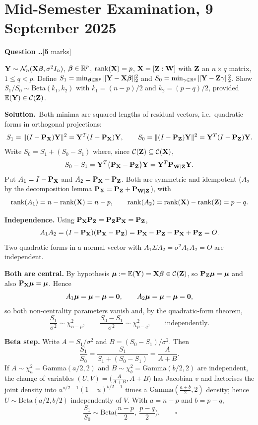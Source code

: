 \documentclass[11pt]{article}
\newcommand{\Pj}{\mathbf{P}}
\newcommand{\Bt}{\mathrm{Beta}}
\newcounter{qq}[section]
\newcommand{\qhead}[2]{\medskip\refstepcounter{qq}%
  \noindent\textbf{\color{Blue}Question \thesection.\theqq.}\hfill\textnormal{[\textbf{#1} marks]}%
  \ifx\relax#2\relax\else\par\smallskip\fi}
\newcommand{\sol}{\smallskip\noindent\textbf{\color{ForestGreen}Solution.}\ }
\begin{document}
\section{Mid-Semester Examination, 9 September 2025}

\qhead{5}{}
\begin{stmt}
$\mathbf{Y}\sim\mathcal{N}_n(\mathbf{X}\boldsymbol{\beta},\sigma^2I_n)$, $\boldsymbol{\beta}\in\mathbb{R}^p$, $\operatorname{rank}(\mathbf{X})=p$, $\mathbf{X}=[\mathbf{Z}:\mathbf{W}]$ with $\mathbf{Z}$
an $n\times q$ matrix, $1\le q<p$. Define
$S_1=\min_{\boldsymbol{\beta}\in\mathbb{R}^p}\|\mathbf{Y}-\mathbf{X}\boldsymbol{\beta}\|_2^2$ and $S_0=\min_{\gamma\in\mathbb{R}^q}\|\mathbf{Y}-\mathbf{Z}\gamma\|_2^2$.
Show $S_1/S_0\sim\Bt(k_1,k_2)$ with $k_1=(n-p)/2$ and $k_2=(p-q)/2$, provided
$\mathbb{E}(\mathbf{Y})\in\mathcal{C}(\mathbf{Z})$.
\end{stmt}

\sol Both minima are squared lengths of residual vectors, i.e.\ quadratic forms in
orthogonal projections:
\[
  S_1=\|(I-\Pj_\bX)\bY\|^2=\bY^T(I-\Pj_\bX)\bY,
  \qquad
  S_0=\|(I-\Pj_\bZ)\bY\|^2=\bY^T(I-\Pj_\bZ)\bY.
\]
Write $S_0=S_1+(S_0-S_1)$ where, since $\mathcal{C}(\mathbf{Z})\subseteq\mathcal{C}(\mathbf{X})$,
\[
  S_0-S_1=\bY^T\big(\Pj_\bX-\Pj_\bZ\big)\bY=\bY^T\Pj_{\bW\mid\bZ}\bY .
\]
Put $A_1=I-\Pj_\bX$ and $A_2=\Pj_\bX-\Pj_\bZ$. Both are symmetric and idempotent
($A_2$ by the decomposition lemma $\Pj_\bX=\Pj_\bZ+\Pj_{\bW\mid\bZ}$), with
\[
  \operatorname{rank}(A_1)=n-\operatorname{rank}(\mathbf{X})=n-p,
  \qquad
  \operatorname{rank}(A_2)=\operatorname{rank}(\mathbf{X})-\operatorname{rank}(\mathbf{Z})=p-q.
\]

\textbf{Independence.} Using $\Pj_\bX\Pj_\bZ=\Pj_\bZ\Pj_\bX=\Pj_\bZ$,
\[
  A_1A_2=(I-\Pj_\bX)(\Pj_\bX-\Pj_\bZ)=\Pj_\bX-\Pj_\bZ-\Pj_\bX+\Pj_\bZ=O .
\]
Two quadratic forms in a normal vector with $A_1\Sigma A_2=\sigma^2A_1A_2=O$ are
independent.

\textbf{Both are central.} By hypothesis $\boldsymbol{\mu}:=\mathbb{E}(\mathbf{Y})=\mathbf{X}\boldsymbol{\beta}\in\mathcal{C}(\mathbf{Z})$, so
$\Pj_\bZ\bmu=\bmu$ and also $\Pj_\bX\bmu=\bmu$. Hence
\[
  A_1\boldsymbol{\mu}=\boldsymbol{\mu}-\boldsymbol{\mu}=\mathbf{0}, \qquad A_2\boldsymbol{\mu}=\boldsymbol{\mu}-\boldsymbol{\mu}=\mathbf{0},
\]
so both non-centrality parameters vanish and, by the quadratic-form theorem,
\[
  \frac{S_1}{\sigma^2}\sim\chi^2_{n-p},
  \qquad
  \frac{S_0-S_1}{\sigma^2}\sim\chi^2_{p-q},
  \qquad\text{independently.}
\]

\textbf{Beta step.} Write $A=S_1/\sigma^2$ and $B=(S_0-S_1)/\sigma^2$. Then
\[
  \frac{S_1}{S_0}=\frac{S_1}{S_1+(S_0-S_1)}=\frac{A}{A+B}.
\]
If $A\sim\chi^2_a=\text{Gamma}(a/2,2)$ and $B\sim\chi^2_b=\text{Gamma}(b/2,2)$ are
independent, the change of variables $(U,V)=\big(\tfrac{A}{A+B},A+B\big)$ has Jacobian $v$
and factorises the joint density into $u^{a/2-1}(1-u)^{b/2-1}$ times a
$\text{Gamma}(\tfrac{a+b}{2},2)$ density; hence $U\sim\Bt(a/2,b/2)$ independently of $V$.
With $a=n-p$ and $b=p-q$,
\[
  \boxed{\ \frac{S_1}{S_0}\sim\Bt\Big(\frac{n-p}{2},\ \frac{p-q}{2}\Big).\ }\qquad\square
\]
\end{document}
